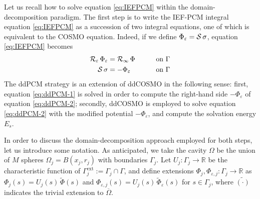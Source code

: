 

Let us recall how to solve equation \eqref{eq:IEFPCM} within the domain-decomposition paradigm. The first step is to write the IEF-PCM integral equation \eqref{eq:IEFPCM} as a succession of two integral equations, one of which is equivalent to the COSMO equation\cite{Cances_Librone_PCM}. Indeed, if we define $\Phi_\varepsilon = \mathcal{S} \, \sigma$, equation \eqref{eq:IEFPCM} becomes
\begin{alignat}{3}
\mathcal{R}_\varepsilon \, \Phi_\varepsilon & = \mathcal{R}_\infty \, \Phi \qquad && \text{on }\Gamma  \label{eq:ddPCM-1} \\
\mathcal{S} \, \sigma & = -\Phi_\varepsilon  && \text{on }\Gamma \label{eq:ddPCM-2} 
\end{alignat}
The ddPCM strategy is an extension of ddCOSMO in the following sense: first, equation \eqref{eq:ddPCM-1} is solved in order to compute the right-hand side $-\Phi_\varepsilon$ of equation \eqref{eq:ddPCM-2}; secondly, ddCOSMO is employed to solve equation \eqref{eq:ddPCM-2} with the modified potential $-\Phi_\varepsilon$, and compute the solvation energy $E_s$.

In order to discuss the domain-decomposition approach employed for both steps, let us introduce some notation. As anticipated, we take the cavity $\Omega$ be the union of $M$ spheres $\Omega_j = B(x_j, r_j)$ with boundaries $\Gamma_j$. Let $U_j: \Gamma_j \to \mathbb{R}$ be the characteristic function of $\Gamma_j^\text{ext}:= \Gamma_j \cap \Gamma$, and define extensions $\Phi_j , \Phi_{\varepsilon,j} : \Gamma_j \to \mathbb{R}$ as  $\Phi_j (s)= U_j(s) \, \widetilde{\Phi}(s)$ and $\Phi_{\varepsilon,j}(s)= U_j(s) \, \widetilde{\Phi}_{\varepsilon}(s)$ for $s \in \Gamma_j$, where $\tilde{(\cdot)}$ indicates the trivial extension to $\overline{\Omega}$.


